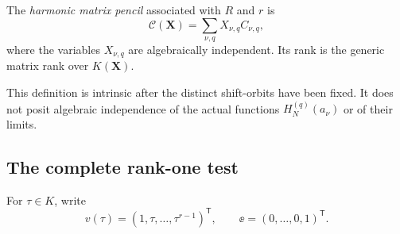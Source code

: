 \begin{definition}
The \emph{harmonic matrix pencil} associated with $R$ and $r$ is
\begin{equation}\label{eq:harmonic-pencil}
 \mathscr C(\bm X)=\sum_{\nu,q}X_{\nu,q}C_{\nu,q},
\end{equation}
where the variables $X_{\nu,q}$ are algebraically independent. Its rank
is the generic matrix rank over $K(\bm X)$.
\end{definition}
This definition is intrinsic after the distinct shift-orbits have been
fixed. It does not posit algebraic independence of the actual functions
$H_N^{(q)}(a_\nu)$ or of their limits.

\subsection{The complete rank-one test}
For $\tau\in K$, write
\[
 v(\tau)=(1,\tau,\ldots,\tau^{r-1})^{\mathsf T},\qquad
 \ee=(0,\ldots,0,1)^{\mathsf T}.
\]

